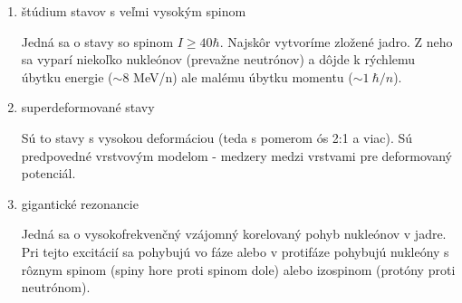 \documentclass[../../main.tex]{subfiles}
\begin{document}
\begin{enumerate}
\item štúdium stavov s veľmi vysokým spinom

Jedná sa o stavy so spinom $I\geq 40\hbar$. Najskôr vytvoríme zložené jadro. Z neho sa vyparí niekoľko nukleónov (prevažne neutrónov) a dôjde k rýchlemu úbytku energie ($\sim 8$ MeV/n) ale malému úbytku momentu ($\sim 1\:\unit{\hbar /n}$). 

\item superdeformované stavy

Sú to stavy s vysokou deformáciou (teda s pomerom ós 2:1 a viac). Sú predpovedné vrstvovým modelom - medzery medzi vrstvami pre deformovaný potenciál.

\item gigantické rezonancie

Jedná sa o vysokofrekvenčný vzájomný korelovaný pohyb nukleónov v jadre. Pri tejto excitácií sa pohybujú vo fáze alebo v protifáze pohybujú nukleóny s rôznym spinom (spiny hore proti spinom dole) alebo izospinom (protóny proti neutrónom). 
\end{enumerate}
\end{document}
